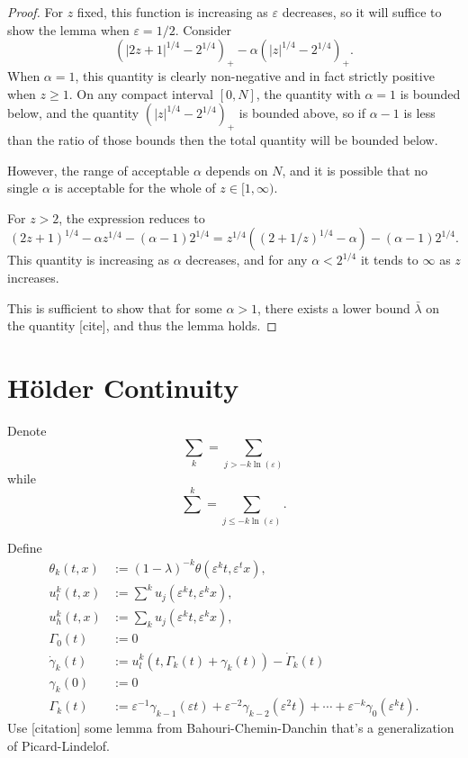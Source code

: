 \documentclass[11pt]{amsart}
\theoremstyle{remark}
\newcommand{\eps}{\varepsilon}
\newcommand{\paren}[1]{\left( #1 \right)}
\newcommand{\n}{^{-1}}
\newcommand{\ulow}{u_l}
\newcommand{\uhigh}{u_h}
\newcommand{\ulowth}[1]{\ulow^{#1}}
\newcommand{\uhighth}[1]{\uhigh^{#1}}
\begin{document}
\begin{proof}
For $z$ fixed, this function is increasing as $\eps$ decreases, so it will suffice to show the lemma when $\eps = 1/2$.  Consider
\[ \paren{|2 z + 1|^{1/4} - 2^{1/4}}_+ - \alpha \paren{|z|^{1/4} - 2^{1/4}}_+. \]
When $\alpha = 1$, this quantity is clearly non-negative and in fact strictly positive when $z \geq 1$.  On any compact interval $[0,N]$, the quantity with $\alpha = 1$ is bounded below, and the quantity $\paren{|z|^{1/4} - 2^{1/4}}_+$ is bounded above, so if $\alpha-1$ is less than the ratio of those bounds then the total quantity will be bounded below.  

However, the range of acceptable $\alpha$ depends on $N$, and it is possible that no single $\alpha$ is acceptable for the whole of $z \in [1,\infty)$.  

For $z > 2$, the expression reduces to
\[ (2z+1)^{1/4} - \alpha z^{1/4} - (\alpha-1) 2^{1/4} = z^{1/4} \paren{(2 + 1/z)^{1/4} - \alpha} - (\alpha-1)2^{1/4}. \]
This quantity is increasing as $\alpha$ decreases, and for any $\alpha < 2^{1/4}$ it tends to $\infty$ as $z$ increases. 

This is sufficient to show that for some $\alpha > 1$, there exists a lower bound $\bar{\lambda}$ on the quantity [cite], and thus the lemma holds. 
\end{proof}


\section{H\"{o}lder Continuity}

Denote
\[ \sum_k = \sum_{j > - k \ln(\eps)} \]
while
\[ \sum^k = \sum_{j \leq -k \ln(\eps)}. \]

Define
\begin{align*} 
\theta_k(t,x) &:= (1-\lambda)^{-k} \theta(\eps^k t, \eps^t x), \\
\ulowth{k}(t,x) &:= \sum^k u_j(\eps^k t, \eps^k x), \\
\uhighth{k}(t,x) &:= \sum_k u_j(\eps^k t, \eps^k x), \\
\Gamma_0(t) &:= 0 \\
\dot{\gamma}_k(t) &:= \ulowth{k}(t, \Gamma_k(t) + \gamma_k(t)) - \dot{\Gamma}_k(t) \\
\gamma_k(0) &:= 0 \\
\Gamma_k(t) &:= \eps\n \gamma_{k-1}(\eps t) + \eps^{-2} \gamma_{k-2}(\eps^2 t) + \cdots + \eps^{-k} \gamma_0(\eps^k t). 
\end{align*}
Use [citation] some lemma from Bahouri-Chemin-Danchin that's a generalization of Picard-Lindelof.  
\end{document}

